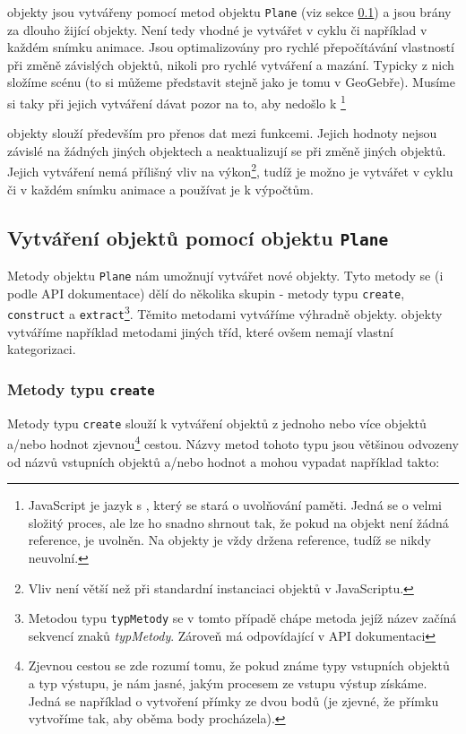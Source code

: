  objekty jsou vytvářeny pomocí metod objektu \texttt{Plane} (viz sekce \ref{subsec:creating-objects}) a jsou brány za dlouho žijící objekty. 
Není tedy vhodné je vytvářet v cyklu či například v každém snímku animace.
Jsou optimalizovány pro rychlé přepočítávání vlastností při změně závislých objektů, nikoli pro rychlé vytváření a mazání.
Typicky z nich složíme scénu (to si můžeme představit stejně jako je tomu v GeoGebře).
Musíme si taky při jejich vytváření dávat pozor na to, aby nedošlo k \footnote{JavaScript je jazyk s , který se stará o uvolňování paměti. Jedná se o velmi složitý proces, ale lze ho snadno shrnout tak, že pokud na objekt není žádná reference, je uvolněn. Na  objekty je vždy držena reference, tudíž se nikdy neuvolní.} 

 objekty slouží především pro přenos dat mezi funkcemi. 
Jejich hodnoty nejsou závislé na žádných jiných objektech a neaktualizují se při změně jiných objektů.
Jejich vytváření nemá přílišný vliv na výkon\footnote{Vliv není větší než při standardní instanciaci objektů v JavaScriptu.}, tudíž je možno je vytvářet v cyklu či v každém snímku animace a používat je k výpočtům.


\subsection[Vytváření]{Vytváření objektů pomocí objektu \texttt{Plane}}
\label{subsec:creating-objects}

Metody objektu \texttt{Plane} nám umožnují vytvářet nové objekty. 
Tyto metody se (i podle API dokumentace) dělí do několika skupin - metody typu \texttt{create}, \texttt{construct} a \texttt{extract}\footnote{Metodou typu \texttt{typMetody} se v tomto případě chápe metoda jejíž název začíná sekvencí znaků \textit{typMetody}. Zároveň má odpovídající  v API dokumentaci}.
Těmito metodami vytváříme výhradně  objekty. 
 objekty vytváříme například metodami jiných tříd, které ovšem nemají vlastní kategorizaci.

\subsubsection[Create]{Metody typu \texttt{create}}
\label{subsubsec:create-methods}

Metody typu \texttt{create} slouží k vytváření objektů z jednoho nebo více objektů a/nebo hodnot zjevnou\footnote{Zjevnou cestou se zde rozumí tomu, že pokud známe typy vstupních objektů a typ výstupu, je nám jasné, jakým procesem ze vstupu výstup získáme. Jedná se například o vytvoření přímky ze dvou bodů (je zjevné, že přímku vytvoříme tak, aby oběma body procházela).} cestou.
Názvy metod tohoto typu jsou většinou odvozeny od názvů vstupních objektů a/nebo hodnot a mohou vypadat například takto: 

